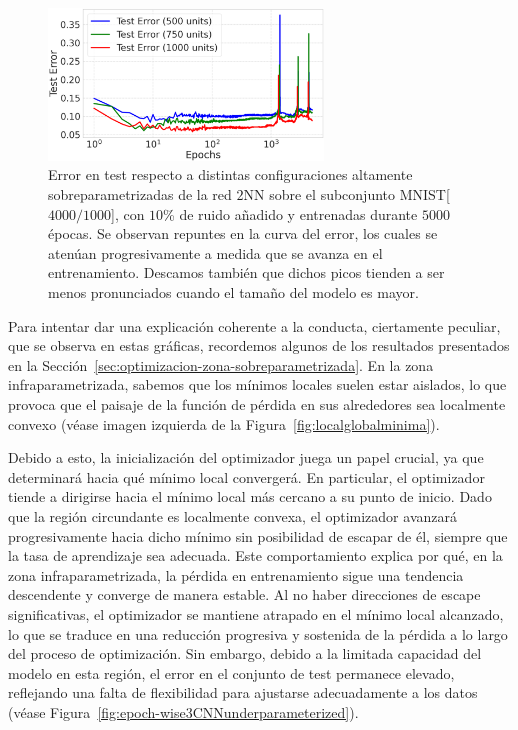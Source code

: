 \begin{figure}[h!]
    \centering
    \includegraphics[width=0.65\textwidth]{img/experiments/epoch-wiseMNIST.png}
    \caption[Error en test respecto a distintas configuraciones altamente sobreparametrizadas de la red $2$NN.]{Error en test respecto a distintas configuraciones altamente sobreparametrizadas de la red $2$NN sobre el subconjunto MNIST[$4000/1000$], con $10$\% de ruido añadido y entrenadas durante $5000$ épocas. Se observan repuntes en la curva del error, los cuales se atenúan progresivamente a medida que se avanza en el entrenamiento. Descamos también que dichos picos tienden a ser menos pronunciados cuando el tamaño del modelo es mayor.}\label{fig:epoch-wiseMNIST}
\end{figure}

Para intentar dar una explicación coherente a la conducta, ciertamente peculiar, que se observa en estas gráficas, recordemos algunos de los resultados presentados en la Sección~\ref{sec:optimizacion-zona-sobreparametrizada}. En la zona infraparametrizada, sabemos que los mínimos locales suelen estar aislados, lo que provoca que el paisaje de la función de pérdida en sus alrededores sea localmente convexo (véase imagen izquierda de la Figura~\ref{fig:localglobalminima}).

Debido a esto, la inicialización del optimizador juega un papel crucial, ya que determinará hacia qué mínimo local convergerá. En particular, el optimizador tiende a dirigirse hacia el mínimo local más cercano a su punto de inicio. Dado que la región circundante es localmente convexa, el optimizador avanzará progresivamente hacia dicho mínimo sin posibilidad de escapar de él, siempre que la tasa de aprendizaje sea adecuada. Este comportamiento explica por qué, en la zona infraparametrizada, la pérdida en entrenamiento sigue una tendencia descendente y converge de manera estable. Al no haber direcciones de escape significativas, el optimizador se mantiene atrapado en el mínimo local alcanzado, lo que se traduce en una reducción progresiva y sostenida de la pérdida a lo largo del proceso de optimización. Sin embargo, debido a la limitada capacidad del modelo en esta región, el error en el conjunto de test permanece elevado, reflejando una falta de flexibilidad para ajustarse adecuadamente a los datos (véase Figura~\ref{fig:epoch-wise3CNNunderparameterized}).

